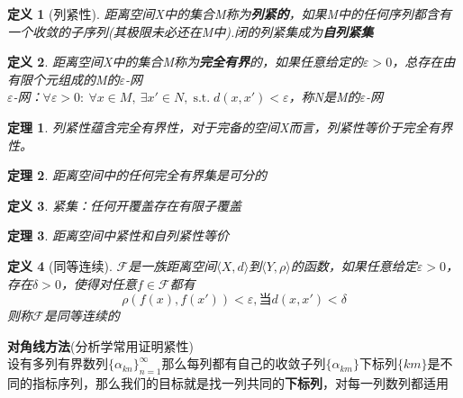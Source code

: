 \documentclass[12pt, a4paper, oneside, fontset=windows]{ctexbook}
\newtheorem{theorem}{定理}[section]
\newtheorem{definition}{定义}[section]
\DeclareMathOperator{\st}{\mathrm{s.t.}}
\begin{document}
    \begin{definition}[列紧性]
        距离空间X中的集合M称为\textbf{列紧的}，如果M中的任何序列都含有一个收敛的子序列(其极限未必还在M中).闭的列紧集成为\textbf{自列紧集}
    \end{definition}

    \begin{definition}
        距离空间X中的集合M称为\textbf{完全有界}的，如果任意给定的$\varepsilon > 0$，总存在由有限个元组成的M的$\varepsilon$-网\\
        $\varepsilon$-网：$\forall \varepsilon > 0:\ \forall x \in M,\ \exists x' \in N,\st d(x,x')<\varepsilon$，称N是M的$\varepsilon$-网
    \end{definition}

    \begin{theorem}
        列紧性蕴含完全有界性，对于完备的空间X而言，列紧性等价于完全有界性。
    \end{theorem}

    \begin{theorem}
        距离空间中的任何完全有界集是可分的
    \end{theorem}

    \begin{definition}
        紧集：任何开覆盖存在有限子覆盖
    \end{definition}

    \begin{theorem}
        距离空间中紧性和自列紧性等价
    \end{theorem}

    \begin{definition}[同等连续]
        $\mathcal{F}$是一族距离空间$\langle X,d \rangle$到$\langle Y,\rho \rangle$的函数，如果任意给定$\varepsilon > 0$，存在$\delta > 0$，使得对任意$f\in \mathcal{F}$都有
        \[
            \rho(f(x),f(x'))<\varepsilon,\text{当}d(x,x')<\delta
        \]
        则称$\mathcal{F}$是同等连续的
    \end{definition}

    \begin{tcolorbox}
        \textbf{对角线方法}(分析学常用证明紧性)\\
        设有多列有界数列$\{\alpha_{kn}\}_{n=1}^{\infty}$那么每列都有自己的收敛子列$\{\alpha_{km}\}$下标列$\{km\}$是不同的指标序列，那么我们的目标就是找一列共同的\textbf{下标列}，对每一列数列都适用
    \end{tcolorbox}
\end{document}
